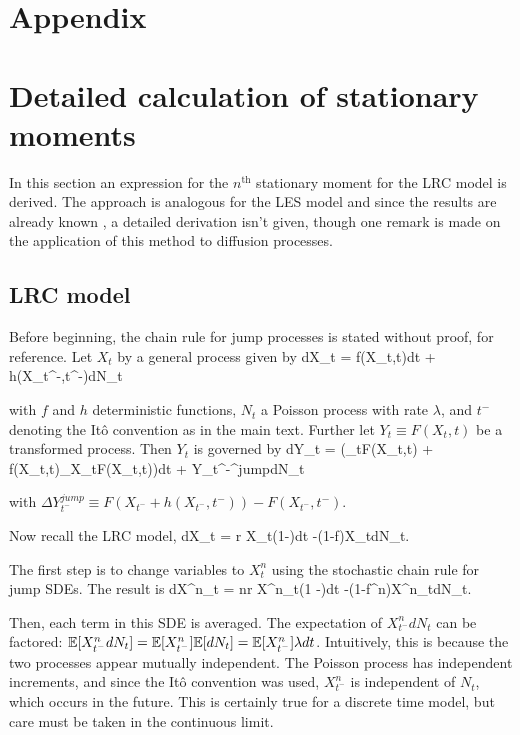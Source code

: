 \appendix
\renewcommand{\theequation}{\thesection\arabic{equation}}
\setcounter{equation}{0}

\section*{Appendix}
\section{Detailed calculation of stationary moments}
In this section an expression for the $n^{\text{th}}$ stationary moment for the LRC model is derived.  The approach is analogous for the LES model and since the results are already known \cite{engen2000}, a detailed derivation isn't given, though one remark is made on the application of this method to diffusion processes.

\subsection{LRC model}

Before beginning, the chain rule for jump processes \cite{hansonBook} is stated without proof, for reference.  Let $X_t$ by a general process given by
\be
dX_t = f(X_t,t)dt + h(X_{t^-},t^-)dN_t
\ee

\noindent with $f$ and $h$ deterministic functions, $N_t$ a Poisson process with rate $\lambda$, and $t^-$ denoting the It\^{o} convention as in the main text.  Further let $Y_t \equiv F(X_t,t)$ be a transformed process.  Then $Y_t$ is governed by
\be
dY_t = \left(\partial_tF(X_t,t) + f(X_t,t)\partial_{X_t}F(X_t,t)\right)dt + \Delta Y_{t^-}^{jump}dN_t
\ee

\noindent with $\Delta Y_{t^-}^{jump} \equiv F(X_{t^-} + h(X_{t^-},t^-)) - F(X_{t^-},t^-)$.


Now recall the LRC model,
\be
dX_t = r X_t\left(1-\right)dt  -(1-f)X_tdN_t.
\ee

\noindent The first step is to change variables to $X^n_t$ using the stochastic chain rule for jump SDEs.  The result is
\be
dX^n_t = nr X^n_t\left(1 -\right)dt -(1-f^n)X^n_tdN_t.
\ee

\noindent Then, each term in this SDE is averaged.  The expectation of $X^n_{t^-}dN_t$ can be factored:  $\mathbb{E}[X^n_{t^-}dN_t] = \mathbb{E}[X^n_{t^-}]\mathbb{E}[dN_t] = \mathbb{E}[X^n_{t^-}]\lambda dt$.  Intuitively, this is because the two processes appear mutually independent.  The Poisson process has independent increments, and since the It\^{o} convention was used, $X^n_{t^-}$ is independent of $N_t$, which occurs in the future.  This is certainly true for a discrete time model, but care must be taken in the continuous limit.  

